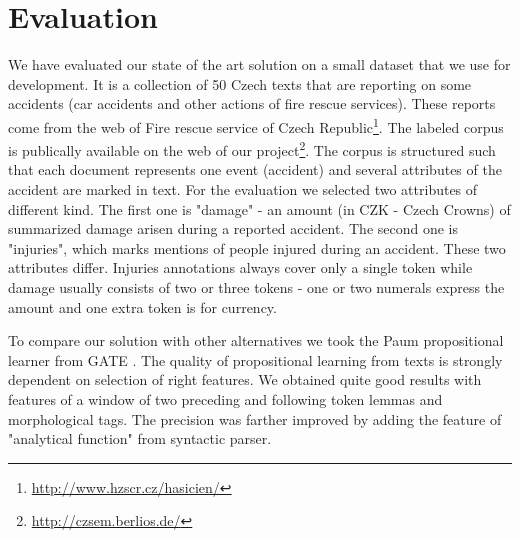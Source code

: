 \documentclass[runningheads,a4paper]{llncs}
\begin{document}
\section{Evaluation}
\label{sec:evaluation}

We have evaluated our state of the art solution on a small dataset that we use for development. It is a collection of 50 Czech texts that are reporting on some accidents (car accidents and other actions of fire rescue services). These reports come from the web of Fire rescue service of Czech Republic\footnote{\url{http://www.hzscr.cz/hasicien/}}. The labeled corpus is publically available on the web of our project\footnote{\url{http://czsem.berlios.de/}}.
The corpus is structured such that each document represents one event (accident) and several attributes of the accident are marked in text. For the evaluation we selected two attributes of different kind. The first one is "damage" - an amount (in CZK - Czech Crowns) of summarized damage arisen during a reported accident. The second one is "injuries", which marks mentions of people injured during an accident. These two attributes differ. Injuries annotations always cover only a single token while damage usually consists of two or three tokens - one or two numerals express the amount and one extra token is for currency.


To compare our solution with other alternatives we took the Paum propositional learner from GATE \cite{Li:Paum}. The quality of propositional learning from texts is strongly dependent on selection of right features. We obtained quite good results with features of a window of two preceding and following token lemmas and morphological tags. The precision was farther improved by adding the feature of "analytical function" from syntactic parser.
\end{document}
